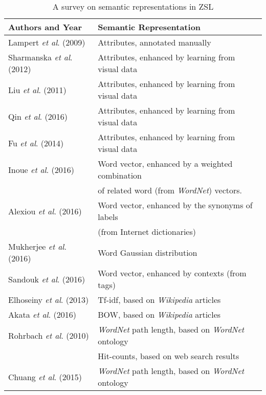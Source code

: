 \documentclass[runningheads,a4paper] {llncs}
\begin{document}
\begin{table*}[t]
{\normalsize
\centering
\caption[]{A survey on semantic representations in ZSL}
\label{table_survey}
\newsavebox{\tablebox}
\begin{lrbox}{\tablebox}
\begin{tabular}{@{}ll}\toprule
  \textbf{Authors and Year} & \textbf{Semantic Representation} \\  \midrule
  Lampert \textit{et al}. (2009)\cite{lampert2009learning}  & Attributes, annotated manually           \\
  Sharmanska \textit{et al}. (2012)\cite{sharmanska2012augmented} & Attributes, enhanced by learning from visual data \\
  Liu \textit{et al}. (2011) \cite{liu2011recognizing} & Attributes, enhanced by learning from visual data\\
  Qin \textit{et al}. (2016) \cite{qin2016beyond} & Attributes, enhanced by learning from visual data \\
  Fu \textit{et al}. (2014) \cite{fu2014learning} & Attributes, enhanced by learning from visual data \\ \midrule
  Inoue \textit{et al}. (2016) \cite{inoue2016adaptation} & Word vector, enhanced by a weighted combination\\
  &\hspace{4ex} of related word (from \textit{WordNet}) vectors.\\
  Alexiou \textit{et al}. (2016) \cite{alexiou2016exploring} & Word vector, enhanced by the synonyms of labels \\
                                                    & \hspace{4ex}(from Internet dictionaries) \\
  Mukherjee \textit{et al}. (2016) \cite{mukherjee2016gaussian} & Word Gaussian distribution \\
  Sandouk \textit{et al}. (2016) \cite{sandouk2016multi} & Word vector, enhanced by contexts (from tags) \\ \midrule
  Elhoseiny \textit{et al}. (2013) \cite{elhoseiny2013write} & Tf-idf, based on \textit{Wikipedia} articles \\
  Akata \textit{et al}. (2016) \cite{akata2016multi} & BOW, based on \textit{Wikipedia} articles\\
  Rohrbach \textit{et al}. (2010) \cite{rohrbach2010helps} & \textit{WordNet} path length, based on \textit{WordNet} ontology\\
                                                  & \hspace{4ex} Hit-counts, based on web search results\\
  Chuang \textit{et al}. (2015) \cite{chuang2015exploring} & \textit{WordNet} path length, based on \textit{WordNet} ontology\\
  
\bottomrule
\end{tabular}
\end{lrbox}
\scalebox{0.8}{\usebox{\tablebox}}
}
\end{table*}
\end{document}
